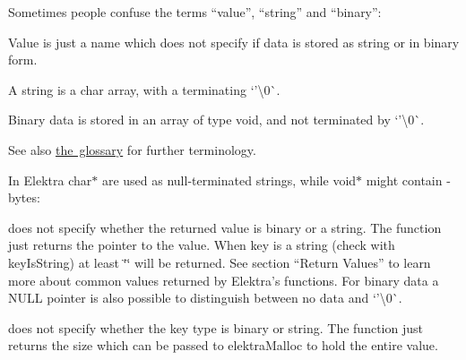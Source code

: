 Sometimes people confuse the terms “value”, “string” and “binary”\+:


\begin{DoxyItemize}
\item Value is just a name which does not specify if data is stored as string or in binary form.
\item A string is a char array, with a terminating `'\textbackslash{}0\textquotesingle{}\`{}.
\item Binary data is stored in an array of type void, and not terminated by `'\textbackslash{}0\textquotesingle{}\`{}.
\end{DoxyItemize}

See also \mbox{\hyperlink{doc_help_elektra-glossary_md}{the glossary}} for further terminology.

In Elektra {\ttfamily char$\ast$} are used as null-\/terminated strings, while {\ttfamily void$\ast$} might contain {}-\/bytes\+:


\begin{DoxyCode}{0}
\end{DoxyCode}


does not specify whether the returned value is binary or a string. The function just returns the pointer to the value. When {\ttfamily key} is a string (check with {\ttfamily key\+Is\+String}) at least {\ttfamily \char`\"{}\char`\"{}} will be returned. See section “\+Return Values” to learn more about common values returned by Elektra’s functions. For binary data a {\ttfamily N\+U\+LL} pointer is also possible to distinguish between no data and `'\textbackslash{}0\textquotesingle{}\`{}.


\begin{DoxyCode}{0}
\end{DoxyCode}


does not specify whether the key type is binary or string. The function just returns the size which can be passed to {\ttfamily elektra\+Malloc} to hold the entire value.


\begin{DoxyCode}{0}
\end{DoxyCode}


